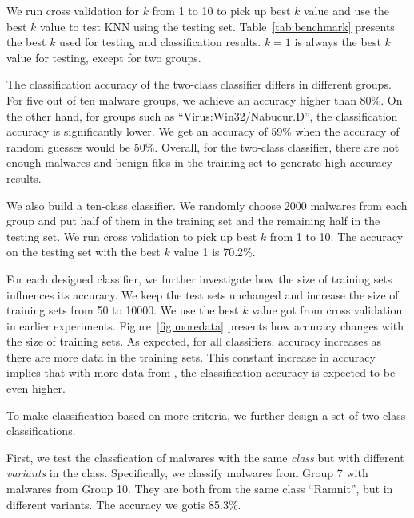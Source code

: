 We run cross validation for $k$ from 1 to 10 to pick up best $k$ value
and use the best $k$ value to test KNN using the testing set. 
Table~\ref{tab:benchmark} presents the best $k$ used for testing and classification results.
$k=1$ is always the best $k$ value for testing, except for two groups.

The classification accuracy of the two-class classifier differs in different groups.
For five out of ten malware groups, we achieve an accuracy higher than 80\%.
On the other hand, for
groups such as ``Virus:Win32/Nabucur.D'',
the classification accuracy is significantly lower. 
We get an accuracy of 59\% when
the accuracy of random guesses would be 50\%.
Overall, for the two-class classifier, 
there are not enough malwares and benign files in the training set to generate high-accuracy results. 

We also build a ten-class classifier.
We randomly choose 2000 malwares from each group and put half of them in the training set and the remaining half in the testing set. 
We run cross validation to pick up best $k$ from 1 to 10. 
The accuracy on the testing set with the best $k$ value 1 is 70.2\%. 





For each designed classifier, we further investigate 
how the size of training sets influences its accuracy.
We keep the test sets unchanged and increase the size of training sets from 50 to 10000.
We use the best $k$ value got from cross validation in earlier experiments.
Figure~\ref{fig:moredata} presents how accuracy changes with the size of training sets. 
As expected, for all classifiers, accuracy increases as there are more data in the training sets.
This constant increase in accuracy implies that with more data from \vt,
the classification accuracy is expected to be even higher.

To make classification based on more criteria, 
we further design a set of two-class classifications. 

First, we test the classfication of malwares with the same {\em class} but with different {\em variants} in the class.
Specifically, we classify malwares from Group 7 with malwares from Group 10. 
They are both from the same class ``Ramnit'', but in different variants. 
The accuracy we gotis 85.3\%. 

